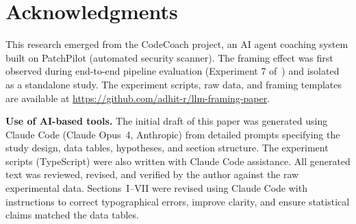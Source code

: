 \documentclass[conference,10pt]{IEEEtran}
\begin{document}
\section*{Acknowledgments}

This research emerged from the CodeCoach project, an AI agent coaching system built on PatchPilot (automated security scanner).
The framing effect was first observed during end-to-end pipeline evaluation (Experiment 7 of~\cite{rajasekaran-codecoach}) and isolated as a standalone study.
The experiment scripts, raw data, and framing templates are available at \url{https://github.com/adhit-r/llm-framing-paper}.

\smallskip\noindent\textbf{Use of AI-based tools.}
The initial draft of this paper was generated using Claude Code (Claude Opus~4, Anthropic) from detailed prompts specifying the study design, data tables, hypotheses, and section structure.
The experiment scripts (TypeScript) were also written with Claude Code assistance.
All generated text was reviewed, revised, and verified by the author against the raw experimental data.
Sections~I--VII were revised using Claude Code with instructions to correct typographical errors, improve clarity, and ensure statistical claims matched the data tables.
\end{document}
